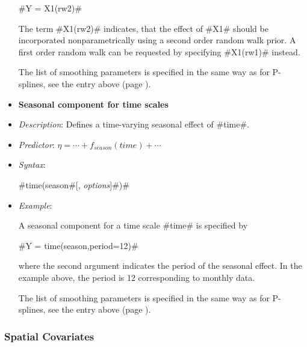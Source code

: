 \begin{itemize}
#Y = X1(rw2)#

The term #X1(rw2)# indicates, that the effect of
#X1# should be incorporated nonparametrically using a second order
random walk prior. A first order random walk can be requested by
specifying #X1(rw1)# instead.

The list of smoothing parameters is specified in the same way as for P-splines, see the entry above (page \pageref{psplines_stepwise}).

%
%
%
%
%
%


\item[]{\bf\sffamily Seasonal component for time scales}

\item[] {\em Description}: Defines a time-varying seasonal effect
of #time#. \item[] {\em Predictor}: $\eta =  \cdots +
f_{season}(time) + \cdots $ \item[] {\em Syntax}:

#time(season#[, {\em options}]#)#
\item[] {\em Example}:

A seasonal component for a time scale #time# is specified by

#Y = time(season,period=12)#

where the second argument indicates the period of the seasonal
effect. In the example above, the period is 12 corresponding to
monthly data.

The list of smoothing parameters is specified in the same way as for P-splines, see the entry above (page \pageref{psplines_stepwise}).
\end{itemize}

\subsubsection*{Spatial Covariates}

